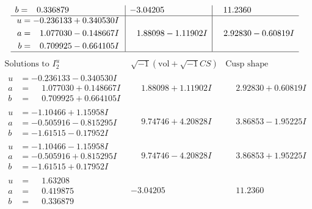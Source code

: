 \documentclass[1p]{elsarticle_modified}
\theoremstyle{definition}
\newcommand{\I}{\sqrt{-1}}
\begin{document}
$$\begin{array}{c|c|c}
\begin{aligned}
b &= \phantom{-}0.336879\phantom{ +0.000000I}\end{aligned}
 & -3.04205\phantom{ +0.000000I} & \phantom{-}11.2360\phantom{ +0.000000I} \\ \hline\begin{aligned}
u &= -0.236133 + 0.340530 I \\
a &= \phantom{-}1.077030 - 0.148667 I \\
b &= \phantom{-}0.709925 - 0.664105 I\end{aligned}
 & \phantom{-}1.88098 - 1.11902 I & \phantom{-}2.92830 - 0.60819 I\\
 \hline 
 \end{array}$$\newpage$$\begin{array}{c|c|c}  
\text{Solutions to }I^u_{2}& \I (\text{vol} + \sqrt{-1}CS) & \text{Cusp shape}\\
 \hline 
\begin{aligned}
u &= -0.236133 - 0.340530 I \\
a &= \phantom{-}1.077030 + 0.148667 I \\
b &= \phantom{-}0.709925 + 0.664105 I\end{aligned}
 & \phantom{-}1.88098 + 1.11902 I & \phantom{-}2.92830 + 0.60819 I \\ \hline\begin{aligned}
u &= -1.10466 + 1.15958 I \\
a &= -0.505916 - 0.815295 I \\
b &= -1.61515 - 0.17952 I\end{aligned}
 & \phantom{-}9.74746 + 4.20828 I & \phantom{-}3.86853 - 1.95225 I \\ \hline\begin{aligned}
u &= -1.10466 - 1.15958 I \\
a &= -0.505916 + 0.815295 I \\
b &= -1.61515 + 0.17952 I\end{aligned}
 & \phantom{-}9.74746 - 4.20828 I & \phantom{-}3.86853 + 1.95225 I \\ \hline\begin{aligned}
u &= \phantom{-}1.63208\phantom{ +0.000000I} \\
a &= \phantom{-}0.419875\phantom{ +0.000000I} \\
b &= \phantom{-}0.336879\phantom{ +0.000000I}\end{aligned}
 & -3.04205\phantom{ +0.000000I} & \phantom{-}11.2360\phantom{ +0.000000I} \\ \hline\begin{aligned}

\end{aligned}
\end{array}$$
\end{document}
